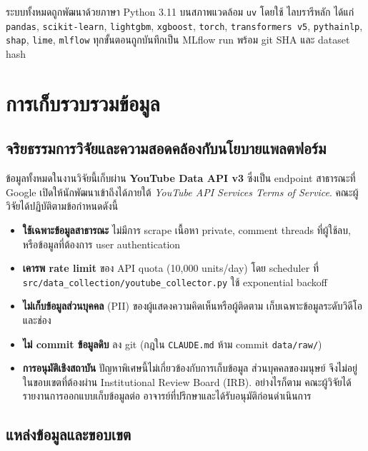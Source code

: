 ระบบทั้งหมดถูกพัฒนาด้วยภาษา Python 3.11 บนสภาพแวดล้อม \texttt{uv} โดยใช้
ไลบรารีหลัก ได้แก่ \texttt{pandas}, \texttt{scikit-learn}, \texttt{lightgbm},
\texttt{xgboost}, \texttt{torch}, \texttt{transformers v5}, \texttt{pythainlp},
\texttt{shap}, \texttt{lime}, \texttt{mlflow} ทุกขั้นตอนถูกบันทึกเป็น MLflow
run พร้อม git SHA และ dataset hash

\section{การเก็บรวบรวมข้อมูล}
\label{sec:method-collection}

\subsection{จริยธรรมการวิจัยและความสอดคล้องกับนโยบายแพลตฟอร์ม}
\label{sec:method-ethics}

ข้อมูลทั้งหมดในงานวิจัยนี้เก็บผ่าน \textbf{YouTube Data API v3} ซึ่งเป็น
endpoint สาธารณะที่ Google เปิดให้นักพัฒนาเข้าถึงได้ภายใต้ \emph{YouTube
API Services Terms of Service}. คณะผู้วิจัยได้ปฏิบัติตามข้อกำหนดดังนี้

\begin{itemize}[leftmargin=2em]
  \item \textbf{ใช้เฉพาะข้อมูลสาธารณะ} ไม่มีการ scrape เนื้อหา private,
        comment threads ที่ผู้ใช้ลบ, หรือข้อมูลที่ต้องการ user authentication
  \item \textbf{เคารพ rate limit} ของ API quota (10{,}000 units/day) โดย
        scheduler ที่ \texttt{src/data\_collection/youtube\_collector.py}
        ใช้ exponential backoff
  \item \textbf{ไม่เก็บข้อมูลส่วนบุคคล} (PII) ของผู้แสดงความคิดเห็นหรือผู้ติดตาม
        เก็บเฉพาะข้อมูลระดับวิดีโอและช่อง
  \item \textbf{ไม่ commit ข้อมูลดิบ} ลง git (กฎใน \texttt{CLAUDE.md} ห้าม commit
        \texttt{data/raw/})
  \item \textbf{การอนุมัติเชิงสถาบัน} ปัญหาพิเศษนี้ไม่เกี่ยวข้องกับการเก็บข้อมูล
        ส่วนบุคคลของมนุษย์ จึงไม่อยู่ในขอบเขตที่ต้องผ่าน Institutional Review
        Board (IRB). อย่างไรก็ตาม คณะผู้วิจัยได้รายงานการออกแบบเก็บข้อมูลต่อ
        อาจารย์ที่ปรึกษาและได้รับอนุมัติก่อนดำเนินการ
\end{itemize}

\subsection{แหล่งข้อมูลและขอบเขต}

